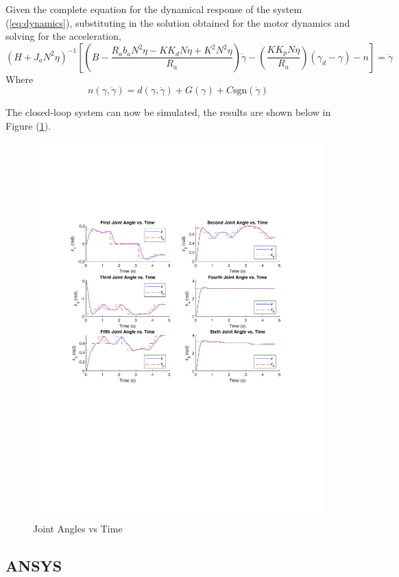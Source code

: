 \documentclass[12pt]{report}
\begin{document}
Given the complete equation for the dynamical response of the system (\ref{eq:dynamics}), substituting in the solution obtained for the motor dynamics and solving for the acceleration,
\begin{equation}
\left(H + J_aN^2\eta\right)^{-1} \left[\left(B - \frac{R_ab_aN^2\eta - KK_dN\eta + K^2N^2\eta}{R_a}\right)\dot{\gamma} - \left(\frac{KK_pN\eta}{R_a}\right)(\gamma_d - \gamma) - n\right]= \ddot{\gamma}
\end{equation}
Where
\[
n(\gamma,\dot{\gamma}) = d(\gamma,\dot{\gamma}) + G(\gamma) + C\text{sgn}(\dot{\gamma})
\]

The closed-loop system can now be simulated, the results are shown below in Figure (\ref{fig:jplots}).
\begin{figure}[htp]
  \center
  \includegraphics[width=.95\textwidth]{jplots}
  \caption{Joint Angles vs Time}
  \label{fig:jplots}
\end{figure}


\newpage
\subsection{ANSYS}
\end{document}
